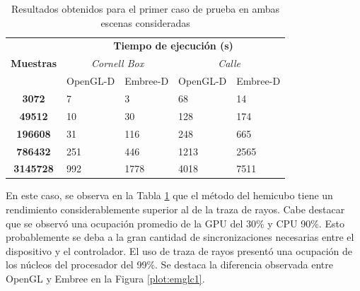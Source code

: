 \begin{table}[htbp]
	\centering
	\begin{tabular}{|c|l|l|l|l|}
		\hline
		\multirow{3}{*}{\textbf{Muestras}} & \multicolumn{4}{c|}{\textbf{Tiempo de ejecución (s)}}                                                                                  \\ \cline{2-5} 
		& \multicolumn{2}{c|}{\textit{Cornell Box}}                 & \multicolumn{2}{c|}{\textit{Calle}}                      \\ \cline{2-5} 
		& \multicolumn{1}{c|}{OpenGL-D} & \multicolumn{1}{c|}{Embree-D} & \multicolumn{1}{c|}{OpenGL-D} & \multicolumn{1}{c|}{Embree-D} \\ \hline
		\textbf{3072}                        & 7                           & 3                           & 68                          & 14                          \\ \hline
		\textbf{49512}                       & 10                          & 30                          & 128                         & 174                         \\ \hline
		\textbf{196608}                       & 31                          & 116                         & 248                         & 665                         \\ \hline
		\textbf{786432}   & 251                         & 446                         & 1213                        & 2565                        \\ \hline
		\textbf{3145728}                      & 992                         & 1778                        & 4018                        & 7511                        \\ \hline
	\end{tabular}
	\caption{Resultados obtenidos para el primer caso de prueba en ambas escenas consideradas}
	\label{tab:tablecaso1}
\end{table}

En este caso, se observa en la Tabla \ref{tab:tablecaso1} que el método del hemicubo tiene un rendimiento considerablemente superior al de la traza de rayos. Cabe destacar que se observó una ocupación promedio de la GPU del 30\% y CPU 90\%. Esto probablemente se deba a la gran cantidad de sincronizaciones necesarias entre el dispositivo y el controlador. El uso de traza de rayos presentó una ocupación de los núcleos del procesador del 99\%. Se destaca la diferencia observada entre OpenGL y Embree en la Figura \ref{plot:emglc1}.

